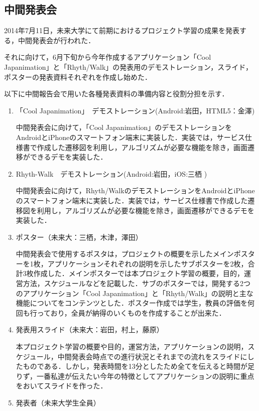 \subsection{中間発表会}
\par
2014年7月11日，未来大学にて前期におけるプロジェクト学習の成果を発表する，中間発表会が行われた．
\par
それに向けて，6月下旬から今年作成するアプリケーション「Cool Japanimation」と「Rhyth/Walk」の発表用のデモストレーション，スライド，ポスターの発表資料それぞれを作成し始めた．
\par
以下に中間報告会で用いた各種発表資料の準備内容と役割分担を示す．
\begin{enumerate}
\item
「Cool Japanimation」　デモストレーション(Android:岩田，HTML5：金澤)
\par 中間発表会に向けて，「Cool Japanimation」のデモストレーションをAndroidとiPhoneのスマートフォン端末に実装した．実装では，サービス仕様書で作成した遷移図を利用し，アルゴリズムが必要な機能を除き，画面遷移ができるデモを実装した．
\item Rhyth-Walk　デモストレーション(Android:岩田，iOS:三栖 )
\par
中間発表会に向けて，Rhyth/WalkのデモストレーションをAndroidとiPhoneのスマートフォン端末に実装した．実装では，サービス仕様書で作成した遷移図を利用し，アルゴリズムが必要な機能を除き，画面遷移ができるデモを実装した．
\item ポスター（未来大：三栖，木津，澤田）
\par
中間発表会で使用するポスタは，プロジェクトの概要を示したメインポスターを1枚，アプリケーションそれぞれの説明を示したサブポスターを2枚，合計3枚作成した．メインポスターでは本プロジェクト学習の概要，目的，運営方法，スケジュールなどを記載した．サブのポスターでは，開発する2つのアプリケーション「Cool Japanimation」と「Rhyth/Walk」の説明と主な機能についてをコンテンツとした．ポスター作成では学生，教員の評価を何回も行っており，全員が納得のいくものを作成することが出来た．
\item 発表用スライド（未来大：岩田，村上，藤原）
\par
本プロジェクト学習の概要や目的，運営方法，アプリケーションの説明，スケジュール，中間発表会時点での進行状況とそれまでの流れをスライドにしたものである．しかし，発表時間を13分としたため全てを伝えると時間が足りず，一番私達が伝えたい今年の特徴としてアプリケーションの説明に重点をおいてスライドを作った．
\item 発表者（未来大学生全員）
\par

\end{enumerate}
